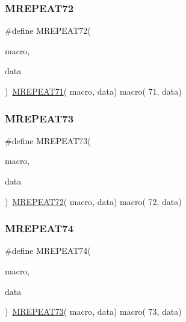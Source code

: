 \mbox{\label{group__group__sam0__utils__mrepeat_gab6f74943a635c95e80aaf53e744212fd}} 
\subsubsection{\texorpdfstring{MREPEAT72}{MREPEAT72}}
{\footnotesize\ttfamily \#define M\+R\+E\+P\+E\+A\+T72(\begin{DoxyParamCaption}\item[{}]{macro,  }\item[{}]{data }\end{DoxyParamCaption})~\mbox{\hyperlink{group__group__sam0__utils__mrepeat_ga702fd0113374ea1ce97cbc50be2332f9}{M\+R\+E\+P\+E\+A\+T71}}( macro, data)   macro( 71, data)}

\mbox{\label{group__group__sam0__utils__mrepeat_gac9174dbacb9c007ef48316a965f67118}} 
\subsubsection{\texorpdfstring{MREPEAT73}{MREPEAT73}}
{\footnotesize\ttfamily \#define M\+R\+E\+P\+E\+A\+T73(\begin{DoxyParamCaption}\item[{}]{macro,  }\item[{}]{data }\end{DoxyParamCaption})~\mbox{\hyperlink{group__group__sam0__utils__mrepeat_gab6f74943a635c95e80aaf53e744212fd}{M\+R\+E\+P\+E\+A\+T72}}( macro, data)   macro( 72, data)}

\mbox{\label{group__group__sam0__utils__mrepeat_ga87d76594b00b293cc7221f7de33e1a41}} 
\subsubsection{\texorpdfstring{MREPEAT74}{MREPEAT74}}
{\footnotesize\ttfamily \#define M\+R\+E\+P\+E\+A\+T74(\begin{DoxyParamCaption}\item[{}]{macro,  }\item[{}]{data }\end{DoxyParamCaption})~\mbox{\hyperlink{group__group__sam0__utils__mrepeat_gac9174dbacb9c007ef48316a965f67118}{M\+R\+E\+P\+E\+A\+T73}}( macro, data)   macro( 73, data)}

